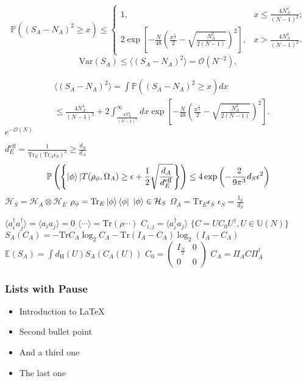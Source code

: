 \documentclass{beamer}
\begin{document}
\begin{frame}
   \[
\mathbb{P}((S_{A}-N_{A})^{2}\geq x)\leq\begin{cases}
1, & x\leq\frac{4N_{A}^{4}}{(N-1)^{2}};\\
2\exp\left[-\frac{N}{48}\left(\frac{x^{\frac{1}{4}}}{2}-\sqrt{\frac{N_{A}^{2}}{2(N-1)}}\right)^{2}\right], & x>\frac{4N_{A}^{4}}{(N-1)^{2}}.
\end{cases}
\]
\[
\mathrm{Var}(S_{A})\leq\langle(S_{A}-N_{A})^{2}\rangle=\mathcal{O}(N^{-2}),
\]
\end{frame}
\begin{frame}
   \begin{align*}
&\langle(S_{A}-N_{A})^{2}\rangle =\int\mathbb{P}((S_{A}-N_{A})^{2}\geq x)dx\\
 & \leq\frac{4N_{A}^{4}}{(N-1)^{2}}+2\int_{\frac{4N_{A}^{4}}{(N-1)^{2}}}^{\infty}dx\exp\left[-\frac{N}{48}\left(\frac{x^{\frac{1}{4}}}{2}-\sqrt{\frac{N_{A}^{2}}{2(N-1)}}\right)^{2}\right].
\end{align*}
$e^{-\mathcal{O}(N)}$
\end{frame}
\begin{frame}
   $d_{E}^{\mathrm{eff}}=\frac{1}{\mathrm{Tr}_{E}(\mathrm{Tr}_{A}\epsilon_{S})^{2}}\geq\frac{d_{S}}{d_{A}}$
   \begin{equation*}
   \mathbb{P}\left(\left\{ \ket{\phi}|T(\rho_{\phi},\Omega_{A})\geq\epsilon+\frac{1}{2}\sqrt{\frac{d_{A}}{d_{E}^{\mathrm{eff}}}}\right\} \right)\leq4\exp{\left(-\frac{2}{9\pi^{3}}d_{S}\epsilon^{2}\right)}
   \end{equation*}
   $\mathcal{H}_S=\mathcal{H}_A\otimes\mathcal{H}_E$
   $\rho_{\phi}=\mathrm{Tr}_E\ket{\phi}\bra{\phi}$
   $\ket{\phi}\in\mathcal{H}_S$
   $\Omega_{A}=\mathrm{Tr}_E\epsilon_S$
   $\epsilon_S=\frac{\mathbb{I}_S}{d_S}$
\end{frame}
\begin{frame}
   $\langle a_{i}^{\dagger}a_{j}^{\dagger}\rangle=\langle a_{i}a_{j}\rangle=0$
    $\langle\cdots\rangle=\mathrm{Tr}(\rho\cdots)$
    $C_{i,j}=\langle a_i^\dag a_{j}\rangle$
    $\{C=UC_{0}U^{\dagger},U\in\mathbb{U}(N)\}$
    $S_{A}(C_{A})=-\mathrm{Tr} C_{A}\log_{2}C_{A}-\mathrm{Tr}(I_{A}-C_{A})\log_{2}(I_{A}-C_{A})$
    $\mathbb{E}(S_{A})=\int d_{\mathrm{H}}(U)S_{A}(C_{A}(U))$
$C_{0}=\begin{pmatrix}I_{\frac{N}{2}} & 0\\
0 & 0
\end{pmatrix}$
$C_{A}=\Pi_A C \Pi_A^{\dagger}$
\end{frame}
\begin{frame}\frametitle{Lists with Pause}
   \begin{itemize}
      \item Introduction to  \LaTeX \pause 
      \item Second bullet point \pause 
      \item And a third one \pause 
      \item The last one
   \end{itemize} 
\end{frame}
\end{document}
